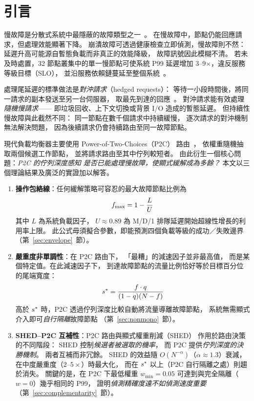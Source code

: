 \section{引言}
\label{sec:intro}

慢故障是分散式系統中最隱蔽的故障類型之一~\cite{huang2017gray, gunawi2018fail}。
在慢故障中，節點仍能回應請求，但處理效能顯著下降。
崩潰故障可透過健康檢查立即偵測，慢故障則不然：
延遲升高可能源自暫態負載而非真正的效能降級，
故障訊號因此模糊不清。
若未及時處置，32 節點叢集中的單一慢節點可使系統 P99 延遲增加
3--9$\times$，違反服務等級目標（SLO），
並沿服務依賴鏈蔓延至整個系統~\cite{dean2013tail}。

處理尾延遲的標準做法是\emph{對沖請求}（hedged requests）：
等待一小段時間後，將同一請求的副本發送至另一台伺服器，
取最先到達的回應~\cite{dean2013tail}。
對沖請求能有效處理\emph{隨機慢請求}——
即垃圾回收、上下文切換或背景 I/O 造成的暫態延遲。
但持續性慢故障與此截然不同：
同一節點在數千個請求中持續緩慢，
逐次請求的對沖機制無法解決問題，
因為後續請求仍會持續路由至同一故障節點。

現代負載均衡器主要使用 Power-of-Two-Choices（P2C）
路由~\cite{mitzenmacher2001power}，
依權重隨機抽取兩個候選工作節點，
並將請求路由至其中佇列較短者。
由此衍生一個核心問題：\emph{P2C 的佇列深度感知
是否已能處理慢故障，使顯式緩解成為多餘？}
本文以三個理論結果及廣泛的實證加以解答。

\begin{enumerate}
\item \textbf{操作包絡線}：任何緩解策略可容忍的最大故障節點比例為
  \begin{equation}
    f_{\max} = 1 - \frac{L}{U}
    \label{eq:envelope}
  \end{equation}
  其中 $L$ 為系統負載因子，
  $U \approx 0.89$ 為 M/D/1 排隊延遲開始超線性增長的利用率上限。
  此公式毋須擬合參數，即能預測四個負載等級的成功／失敗邊界
  （第~\ref{sec:envelope}~節）。

\item \textbf{嚴重度非單調性}：在 P2C 路由下，
  「最糟」的減速因子並非最高值，
  而是某個特定值。在此減速因子下，
  到達故障節點的流量比例恰好等於目標百分位的尾端寬度：
  \begin{equation}
    s^{*} = \frac{f \cdot q}{(1-q)(N-f)}
    \label{eq:sstar}
  \end{equation}
  高於 $s^{*}$ 時，P2C 透過佇列深度比較自動將流量導離故障節點，
  系統無需顯式介入即可\emph{自行隔離}故障節點
  （第~\ref{sec:nonmono}~節）。

\item \textbf{SHED--P2C 互補性}：P2C 路由與顯式權重削減（SHED）
  作用於路由決策的不同階段：
  SHED 控制\emph{候選者被選取的機率}，
  而 P2C 提供\emph{佇列深度的決勝機制}。
  兩者互補而非冗餘。
  SHED 的效益隨 $O(N^{-\alpha})$（$\alpha \approx 1.3$）衰減，
  在中度嚴重度（$2$--$5\times$）時最大化，
  而在 $s^{*}$ 以上（P2C 自行隔離之處）則趨於消失。
  關鍵的是，在 P2C 下最低權重 $w_{\min} = 0.05$
  可達到與完全隔離（$w = 0$）幾乎相同的 P99，
  證明\emph{偵測精確度遠不如偵測速度重要}
  （第~\ref{sec:complementarity}~節）。
\end{enumerate}

